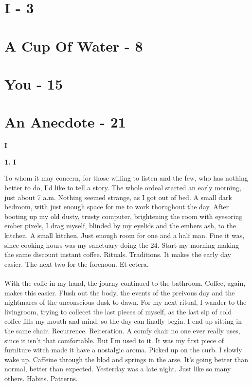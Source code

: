 \documentclass[]{article}
\begin{document}
\section{I - 3}

\section{A Cup Of Water - 8}

\section{You - 15}

\section{An Anecdote - 21}

\newpage

\begin{center}
	\Large\textbf{I}
\end{center}

\begin{center}
	\large\textbf{1. I}
\end{center}

To whom it may concern, for those willing to listen and the few, who has nothing better to do, I'd like to tell a story. The whole ordeal started an early morning, just about 7 a.m. Nothing seemed strange, as I got out of bed. A small dark bedroom, with just enough space for me to work thorughout the day. After booting up my old dusty, trusty computer, brightening the room with eyesoring ember pixels, I drag myself, blinded by my eyelids and the embers ash, to the kitchen. A small kitchen. Just enough room for one and a half man. Fine it was, since cooking hours was my sanctuary doing the 24. Start my morning making the same discount instant coffee. Rituals. Traditions. It makes the early day easier. The next two for the forenoon. Et cetera. 
\\ \\ 
With the coffe in my hand, the journy continued to the bathroom. Coffee, again, makes this easier. Flush out the body, the events of the preivous day and the nightmares of the unconscious dusk to dawn. For my next ritual, I wander to the livingroom, trying to collecet the last pieces of myself, as the last sip of cold coffee fills my mouth and mind, so the day can finally begin. I end up sitting in the same chair. Recurrence. Reiteration. A comfy chair no one ever really uses, since it isn't that comfortable. But I'm used to it. It was my first piece of furniture witch made it have a nostalgic aroma. Picked up on the curb. I slowly wake up. Caffeine through the blod and springs in the arse. It's going better than normal, better than expected. Yesterday was a late night. Just like so many others. Habits. Patterns.
\end{document}
